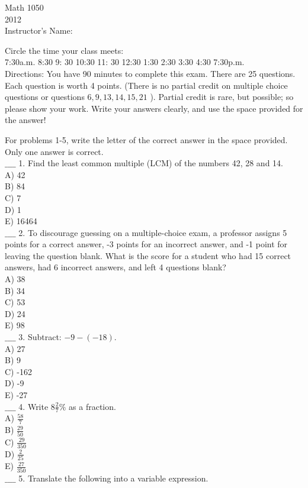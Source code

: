 \documentclass{ximera}
\begin{document}
Math 1050\\
2012\\
Instructor's Name:

Circle the time your class meets:\\
7:30a.m. 8:30 9: 30 10:30 11: 30 12:30 1:30 2:30 3:30 4:30 7:30p.m.\\
Directions: You have 90 minutes to complete this exam. There are 25 questions. Each question is worth 4 points. (There is no partial credit on multiple choice questions or questions $6,9,13,14,15,21$ ). Partial credit is rare, but possible; so please show your work. Write your answers clearly, and use the space provided for the answer!

For problems 1-5, write the letter of the correct answer in the space provided. Only one answer is correct.\\
$\_\_\_\_$ 1. Find the least common multiple (LCM) of the numbers 42, 28 and 14.\\
A) 42\\
B) 84\\
C) 7\\
D) 1\\
E) 16464\\
$\_\_\_\_$ 2. To discourage guessing on a multiple-choice exam, a professor assigns 5 points for a correct answer, -3 points for an incorrect answer, and -1 point for leaving the question blank. What is the score for a student who had 15 correct answers, had 6 incorrect answers, and left 4 questions blank?\\
A) 38\\
B) 34\\
C) 53\\
D) 24\\
E) 98\\
$\_\_\_\_$ 3. Subtract: $-9-(-18)$.\\
A) 27\\
B) 9\\
C) -162\\
D) -9\\
E) -27\\
$\_\_\_\_$ 4. Write $8 \frac{2}{7} \%$ as a fraction.\\
A) $\frac{58}{7}$\\
B) $\frac{29}{50}$\\
C) $\frac{29}{350}$\\
D) $\frac{2}{25}$\\
E) $\frac{27}{350}$\\
$\_\_\_\_$ 5. Translate the following into a variable expression.
\end{document}
